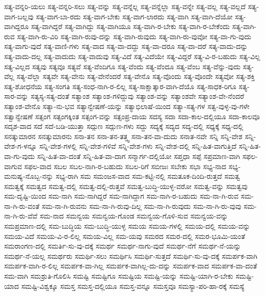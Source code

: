 {ಸತ್ಯ-ವನ್ನರಿ-ಯಲು
ಸತ್ಯ-ವನ್ನರಿ-ಸಲು
ಸತ್ಯ-ವನ್ನು
ಸತ್ಯ-ವನ್ನೆಲ್ಲ
ಸತ್ಯ-ವನ್ನೆಲ್ಲಾ
ಸತ್ಯ-ವನ್ನೇ
ಸತ್ಯ-ವಲ್ಲ
ಸತ್ಯ-ವಲ್ಲದೆ
ಸತ್ಯ-ವಾಗ-ಬಲ್ಲವು
ಸತ್ಯ-ವಾಗ-ಬಾ-ರದು
ಸತ್ಯ-ವಾಗ-ಬೇಕು
ಸತ್ಯ-ವಾಗ-ಲಾರದು
ಸತ್ಯ-ವಾಗಿ
ಸತ್ಯ-ವಾಗಿ-ದೆಯೋ
ಸತ್ಯ-ವಾಗಿದ್ದರೂ
ಸತ್ಯ-ವಾಗಿದ್ದರೆ
ಸತ್ಯ-ವಾಗಿದ್ದು
ಸತ್ಯ-ವಾಗಿಯೂ
ಸತ್ಯ-ವಾಗಿ-ರ-ಬೇಕು
ಸತ್ಯ-ವಾಗಿ-ರ-ಬೇಕೆಂದು
ಸತ್ಯ-ವಾಗಿ-ರುವ
ಸತ್ಯ-ವಾಗಿ-ರು-ವಿರಿ
ಸತ್ಯ-ವಾಗಿ-ರುವು-ದನ್ನು
ಸತ್ಯ-ವಾಗಿ-ರುವುದು
ಸತ್ಯ-ವಾಗಿ-ರು-ವುವೋ
ಸತ್ಯ-ವಾ-ಗು-ವುದು
ಸತ್ಯ-ವಾಗು-ವುದೆ
ಸತ್ಯ-ವಾಣಿ-ಗಳು
ಸತ್ಯ-ವಾದ
ಸತ್ಯ-ವಾ-ದದ್ದು
ಸತ್ಯ-ವಾ-ದರೂ
ಸತ್ಯ-ವಾ-ದರೆ
ಸತ್ಯ-ವಾದು-ದನ್ನು
ಸತ್ಯ-ವಾದು-ದಲ್ಲ
ಸತ್ಯ-ವಾದುದು
ಸತ್ಯ-ವಾದುವು
ಸತ್ಯ-ವಿದೆ
ಸತ್ಯ-ವಿದೆಯೇ
ಸತ್ಯ-ವಿದ್ದರೆ
ಸತ್ಯ-ವಿ-ರ-ಬಹುದು
ಸತ್ಯ-ವಿಲ್ಲ
ಸತ್ಯ-ವಿಲ್ಲದ
ಸತ್ಯವು
ಸತ್ಯವೂ
ಸತ್ಯವೆ
ಸತ್ಯ-ವೆಂದಿಗೂ
ಸತ್ಯ-ವೆಂದು
ಸತ್ಯ-ವೆಂದೂ
ಸತ್ಯ-ವೆಂಬ
ಸತ್ಯ-ವೆನ್ನು-ವುದು
ಸತ್ಯ-ವೆಲ್ಲ
ಸತ್ಯ-ವೆಲ್ಲಾ
ಸತ್ಯವೇ
ಸತ್ಯ-ವೇನು
ಸತ್ಯ-ವೇನೆಂದರೆ
ಸತ್ಯ-ವೇನೊ
ಸತ್ಯ-ವೊಂದು
ಸತ್ಯ-ವೊಂದೇ
ಸತ್ಯವೋ
ಸತ್ಯ-ಶಕ್ತಿ
ಸತ್ಯ-ಶೋಧನೆಯ
ಸತ್ಯ-ಸಂಗತಿ
ಸತ್ಯ-ಸಂಧ-ನಾಗಿ-ರ-ಲಿಲ್ಲ
ಸತ್ಯ-ಸಾಕ್ಷಾತ್ಕಾರ-ವಾಗಿ-ದೆಯೊ
ಸತ್ಯ-ಸಾಧಕ-ರಿಗೂ
ಸತ್ಯ-ಸಾರ-ವನ್ನು
ಸತ್ಯಸ್ಯ-ಸತ್ಯ-ದಂತೆ
ಸತ್ಯಾಂಶ
ಸತ್ಯಾಂಶ-ಗಳಿದ್ದುವು
ಸತ್ಯಾಂಶ-ವನ್ನು
ಸತ್ಯಾಂಶವೇ
ಸತ್ಯಾಂಶ-ವೇ-ನೆಂದರೆ
ಸತ್ಯಾಂಶ-ವೇನೊ
ಸತ್ಯಾ-ನು-ಭವ
ಸತ್ಯಾನ್ವೇಷಣೆ-ಯನ್ನು
ಸತ್ಯಾಭಿಲಾಷೆ-ಯಿಂದ
ಸತ್ಯಾ-ಸತ್ಯ-ಗಳ
ಸತ್ವ-ವುಳ್ಳ-ವು-ಗಳೇ
ಸತ್ವಾನ್ವೇಷಣೆ
ಸತ್ಸಂಗ
ಸತ್ಸಂಗಕ್ಕಿಂತ
ಸತ್ಸಂಗ-ವನ್ನು
ಸತ್ಸಂಪ್ರ-ದಾಯ
ಸದಸ್ಯ
ಸದಾ
ಸದಾ-ಕಾಲ-ದಲ್ಲಿಯೂ
ಸದಾ-ಕಾಲವೂ
ಸದೃಶ-ವಾದ
ಸದೆ
ಸದೆ-ಬಡಿ-ಯುತ್ತಾ
ಸದ್ಗುಣ
ಸದ್ಗುಣ-ಗಳು
ಸದ್ದು
ಸದ್ಯಕ್ಕೆ
ಸದ್ಯದ
ಸದ್ಯ-ದಲ್ಲಿ
ಸಧ್ಯಕ್ಕೆ
ಸಧ್ಯ-ದಲ್ಲಿ
ಸನತ್ಕುಮಾರನ
ಸನತ್ಕುಮಾರನು
ಸನಾ-ತನ
ಸನಾ-ತನ-ತತ್ತ್ವ
ಸನಾ-ತನ-ವಾ-ದುದು
ಸನಾತ-ನವೇ
ಸನ್ನಿ
ಸನ್ನಿ-ವೇಶ
ಸನ್ನಿ-ವೇಶ-ಗ-ಳನ್ನೂ
ಸನ್ನಿ-ವೇಶ-ಗಳಲ್ಲಿ
ಸನ್ನಿ-ವೇಶ-ಗಳಿವೆ
ಸನ್ನಿ-ವೇಶ-ಗಳು
ಸನ್ನಿ-ವೇಶ-ದಲ್ಲಿ
ಸನ್ನಿ-ಹಿತ-ವಾಗುತ್ತಿದೆ
ಸನ್ನಿ-ಹಿತ-ವಾ-ಗು-ವುದು
ಸನ್ನಿ-ಹಿತ-ವಾ-ದಂತೆ
ಸನ್ನಿ-ಹಿತ-ವಾ-ದಾಗ
ಸನ್ಮಾರ್ಗ-ದಲ್ಲಿಯೋ
ಸಪ್ತಧಾ
ಸಪ್ಪೆ
ಸಪ್ರಮಾಣ-ವಾಗಿ
ಸಫಲ-ವಾಗುವ
ಸಫಲ-ವಾದ
ಸಬಲ
ಸಬಲ-ನಾಗಿ-ರ-ಬಹುದು
ಸಬಲ-ರಿಗೆ
ಸಬೀಜಃ
ಸಬೇಕು
ಸಭಾ
ಸಭ್ಯ-ನಾದ
ಸಭ್ಯ-ಮನುಷ್ಯ-ನೊಬ್ಬ-ನನ್ನು
ಸಭ್ಯ-ರಾಗಿ
ಸಮ
ಸಮಂಜಸ-ವಾದ
ಸಮ-ಕಟ್ಟಿ-ನಲ್ಲಿ
ಸಮತೂಕ-ದಿಂದಿ-ರುತ್ತದೆ
ಸಮತ್ವ
ಸಮತ್ವಕ್ಕೆ
ಸಮತ್ವದ
ಸಮತ್ವ-ದಲ್ಲಿ
ಸಮತ್ವ-ದಲ್ಲಿ-ರುತ್ತವೆ
ಸಮತ್ವ-ಬುದ್ಧಿ-ಯುಳ್ಳ-ವರೋ
ಸಮತ್ವ-ವನ್ನು
ಸಮತ್ವವು
ಸಮ-ದೃಷ್ಟಿ-ಯಿಂದ
ಸಮ-ನಾಗಿ
ಸಮ-ನಾಗಿದ್ದರೆ
ಸಮ-ನಾಗಿದ್ದಾಗ
ಸಮ-ನಾಗಿ-ರ-ಬಹುದು
ಸಮ-ನಾ-ಗಿ-ರುವ
ಸಮ-ನಾ-ಗಿ-ರು-ವಂತೆ
ಸಮ-ನಾ-ಗಿ-ರುವನು
ಸಮ-ನಾ-ಗಿ-ರುವು-ದಿಲ್ಲ
ಸಮ-ನಾ-ಗಿ-ರುವುದು
ಸಮ-ನಾ-ಗಿ-ರು-ವುವು
ಸಮ-ನಾ-ಗಿ-ರು-ವೆವೆ
ಸಮ-ನಾದ
ಸಮನ್ವಯ
ಸಮನ್ವಯ-ಗೊಂಡ
ಸಮನ್ವಯ-ಗೊಳಿ-ಸುವ
ಸಮನ್ವಯ-ವನ್ನು
ಸಮಪ್ರಮಾಣ-ದಲ್ಲಿ
ಸಮ-ಬುದ್ಧಿಯ
ಸಮ-ಬುದ್ಧಿ-ಯುಳ್ಳ
ಸಮಯ
ಸಮಯ-ಗಳಲ್ಲಿ
ಸಮಯ-ದಲ್ಲಿ
ಸಮಯ-ವನ್ನು
ಸಮಯ-ವಿದೆ
ಸಮಯ-ವಿ-ರ-ಲಿಲ್ಲ
ಸಮಯ-ವಿಲ್ಲ
ಸಮ-ಯವು
ಸಮರದ
ಸಮರ-ದಲ್ಲಿ
ಸಮರ-ಭೂಮಿ-ಯಂತೆ
ಸಮರಾಂಗಣ-ದಲ್ಲಿ
ಸಮರ್ತಿ-ಸು-ವು-ದಕ್ಕೆ
ಸಮರ್ಥ
ಸಮರ್ಥ-ನಾಗು-ವುದೆ
ಸಮರ್ಥ-ನೆಗೆ
ಸಮರ್ಥ-ನೆ-ಯನ್ನು
ಸಮರ್ಥ-ನೆ-ಯಲ್ಲ
ಸಮರ್ಥರು
ಸಮರ್ಥಿ-ಸಲು
ಸಮರ್ಥಿಸಿ
ಸಮರ್ಥಿ-ಸುತ್ತದೆ
ಸಮರ್ಥಿ-ಸು-ವು-ದಕ್ಕೆ
ಸಮರ್ಪಕ-ವಾಗಿ
ಸಮರ್ಪಕ-ವಾಗಿ-ರ-ಲಿಲ್ಲ
ಸಮರ್ಪಕ-ವಾ-ಗಿಲ್ಲ
ಸಮರ್ಪಕ-ವಾಗಿಲ್ಲ-ದು-ದನ್ನು
ಸಮರ್ಪಕ-ವಾದ
ಸಮರ್ಪಕ-ವಾ-ದಂತೆ
ಸಮ-ವಾಗಿ
ಸಮಶ್ರುತಿ-ಗೊಲಿಸಿ
ಸಮಷ್ಟಿ
ಸಮಷ್ಟಿಗೂ
ಸಮಷ್ಟಿಯ
ಸಮಷ್ಟಿ-ಯನ್ನು
ಸಮಷ್ಟಿ-ಯಾಗಿ-ರ-ಬೇಕು
ಸಮಷ್ಟಿ-ಯಾದ
ಸಮಷ್ಟಿ-ವಿಶ್ವಕ್ಕೂ
ಸಮಸ್ತ
ಸಮಸ್ತ-ದಲ್ಲಿಯೂ
ಸಮಸ್ತ-ವನ್ನೂ
ಸಮಸ್ತವೂ
ಸಮಸ್ಯಾ-ಪರಿ-ಹಾ-ರಕ್ಕೆ
ಸಮಸ್ಯೆ
}
